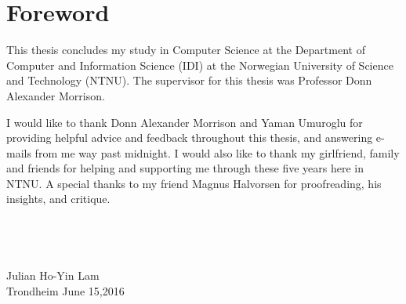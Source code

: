\section*{Foreword}

This thesis concludes my study in Computer Science at the Department
of Computer and Information Science (IDI) at the Norwegian University
of Science and Technology (NTNU). The supervisor for this thesis was Professor
Donn Alexander Morrison.


I would like to thank Donn Alexander Morrison and Yaman Umuroglu for providing helpful advice and feedback throughout this thesis, and answering e-mails from me way past midnight. 
I would also like to thank my girlfriend, family and friends for helping and supporting me through these five years here in NTNU. A special thanks to my friend Magnus Halvorsen  for proofreading, his insights, and critique.
\\ \\
\\
\\
\\


																	Julian Ho-Yin Lam\\
																	Trondheim June 15,2016